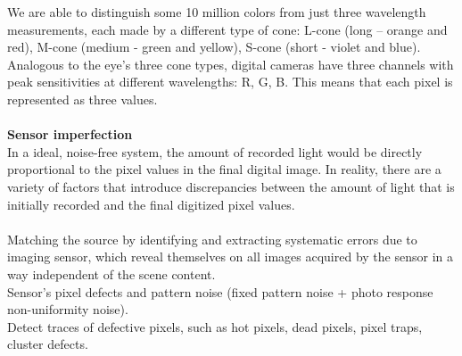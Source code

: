 \documentclass[10pt,a4paper]{book}
\begin{document}
We are able to distinguish some 10 million colors from just three wavelength measurements, each made by a different type of cone: L-cone (long – orange and red), M-cone (medium - green and yellow), S-cone (short - violet and blue).\\
Analogous to the eye's three cone types, digital cameras have three channels with peak sensitivities at different wavelengths: R, G, B. This means that each pixel is represented as three values.\\\\
\textbf{Sensor imperfection}\\
In a ideal, noise-free system, the amount of recorded light would be directly proportional to the pixel values in the final digital image. In reality, there are a variety of factors that introduce discrepancies
between the amount of light that is initially recorded and the final digitized pixel values.\\\\
Matching the source by identifying and extracting systematic errors due to imaging sensor, which reveal themselves on all images acquired by the sensor in a way independent of the scene content.\\
Sensor's pixel defects and pattern noise (fixed pattern noise + photo response non-uniformity noise).\\
Detect traces of defective pixels, such as hot pixels, dead pixels, pixel traps, cluster defects.\\\\
\end{document}
